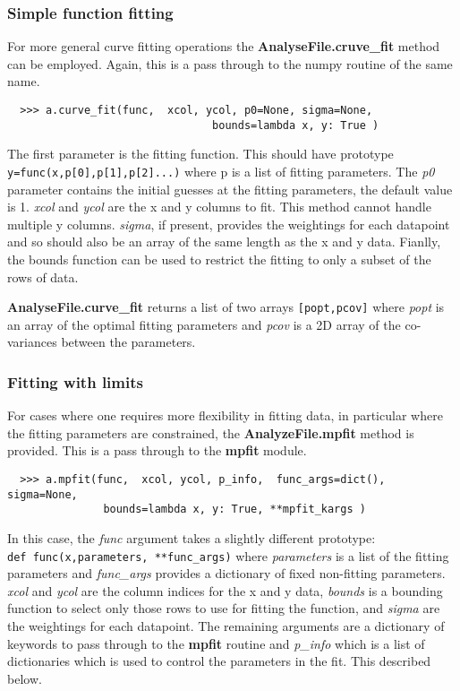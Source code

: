 \documentclass[a4paper,11pt]{scrartcl}
\begin{document}
\subsubsection{Simple function fitting}

For more general curve fitting operations the \textbf{AnalyseFile.cruve\_fit}
method can be employed. Again, this is a pass through to the numpy routine of
the same name.

\begin{verbatim}
  >>> a.curve_fit(func,  xcol, ycol, p0=None, sigma=None,
                                bounds=lambda x, y: True )
\end{verbatim}

The first parameter is the fitting function. This should have prototype
\\\verb:y=func(x,p[0],p[1],p[2]...): where p is a list of fitting parameters.
The \textit{p0} parameter contains the initial guesses at the fitting
parameters, the default value is 1. \textit{xcol} and \textit{ycol} are the x
and y columns to fit. This method cannot handle multiple y columns.
\textit{sigma}, if present, provides the weightings for each datapoint and so
should also be an array of the same length as the x and y data. Fianlly, the
bounds function can be used to restrict the fitting to only a subset of the rows
of data.

\textbf{AnalyseFile.curve\_fit} returns a list of two arrays \verb:[popt,pcov]:
where \textit{popt} is an array of the optimal fitting parameters and
\textit{pcov} is a 2D array of the co-variances between the parameters.

\subsubsection{Fitting with limits}

For cases where one requires more flexibility in fitting data, in particular
where the fitting parameters are constrained, the \textbf{AnalyzeFile.mpfit}
method is provided. This is a pass through to the \textbf{mpfit} module.

\begin{verbatim}
  >>> a.mpfit(func,  xcol, ycol, p_info,  func_args=dict(), sigma=None,
               bounds=lambda x, y: True, **mpfit_kargs )
\end{verbatim}

In this case, the \textit{func} argument takes a slightly different
prototype:\\\verb:def func(x,parameters, **func_args): where \textit{parameters}
is a list of the fitting parameters and \textit{func\_args} provides a
dictionary of fixed \ie non-fitting parameters. \textit{xcol} and \textit{ycol}
are the column indices for the x and y data, \textit{bounds} is a bounding
function to select only those rows to use for fitting the function, and
\textit{sigma} are the weightings for each datapoint. The remaining arguments
are a dictionary of keywords to pass through to the \textbf{mpfit} routine and
\textit{p\_info} which is a list of dictionaries which is used to control the
parameters in the fit. This described below.
\end{document}
